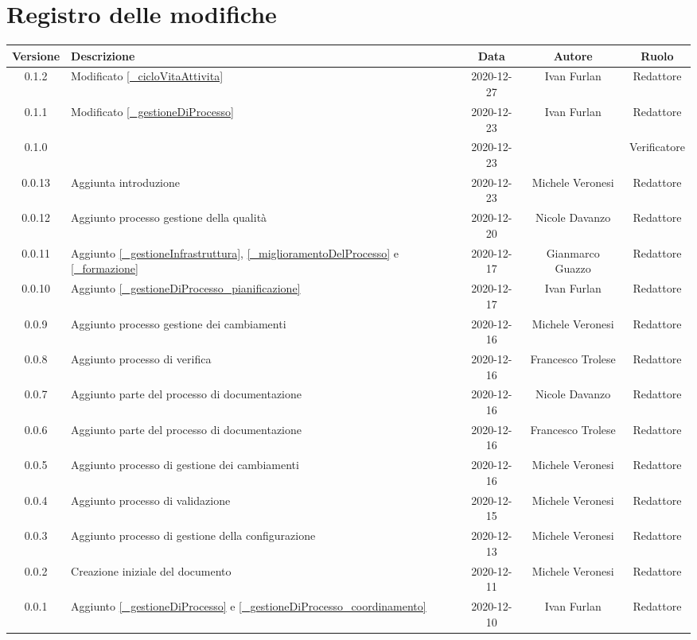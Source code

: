 \section*{Registro delle modifiche}

\begin{center}
	\begin{longtable}{|c|p{5cm}|c|c|c|}
		\hline
		\rowcolor{lighter-grayer}
		\textbf{Versione} & \textbf{Descrizione} & \textbf{Data} & \textbf{Autore} & \textbf{Ruolo} \\
		\hline
		\endfirsthead


		0.1.2 & Modificato \ref{_cicloVitaAttivita} & 2020-12-27& Ivan Furlan & Redattore \\
		0.1.1 & Modificato \ref{_gestioneDiProcesso} & 2020-12-23 & Ivan Furlan & Redattore \\
		0.1.0 &  & 2020-12-23 &  & Verificatore \\
		0.0.13 & Aggiunta introduzione & 2020-12-23 & Michele Veronesi & Redattore \\
		0.0.12 & Aggiunto processo gestione della qualità & 2020-12-20 & Nicole Davanzo & Redattore \\
		0.0.11 & Aggiunto \ref{_gestioneInfrastruttura}, \ref{_miglioramentoDelProcesso} e \ref{_formazione} & 2020-12-17 & Gianmarco Guazzo & Redattore \\
		0.0.10 & Aggiunto \ref{_gestioneDiProcesso_pianificazione} & 2020-12-17 & Ivan Furlan & Redattore \\
		0.0.9 & Aggiunto processo gestione dei cambiamenti & 2020-12-16 & Michele Veronesi & Redattore \\
		0.0.8 & Aggiunto processo di verifica & 2020-12-16 & Francesco Trolese & Redattore \\
		0.0.7 & Aggiunto parte del processo di documentazione & 2020-12-16 & Nicole Davanzo & Redattore \\
		0.0.6 & Aggiunto parte del processo di documentazione & 2020-12-16 & Francesco Trolese & Redattore \\
		0.0.5 & Aggiunto processo di gestione dei cambiamenti & 2020-12-16 & Michele Veronesi & Redattore \\
		0.0.4 & Aggiunto processo di validazione & 2020-12-15 & Michele Veronesi & Redattore \\
		0.0.3 & Aggiunto processo di gestione della configurazione & 2020-12-13 & Michele Veronesi & Redattore \\
		0.0.2 & Creazione iniziale del documento & 2020-12-11 & Michele Veronesi & Redattore \\
		0.0.1 & Aggiunto \ref{_gestioneDiProcesso} e \ref{_gestioneDiProcesso_coordinamento} & 2020-12-10 & Ivan Furlan & Redattore \\
		
		\hline
	\end{longtable}
\end{center}